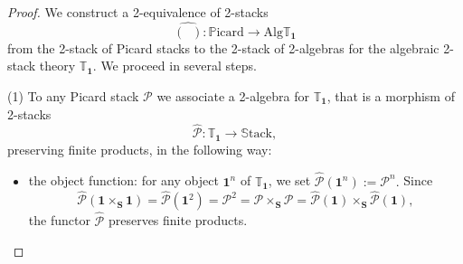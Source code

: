 \documentclass[11pt]{amsart}
\newcommand{\cP}{\mathcal{P}}
\newcommand{\PICARD}{\mathbb{P}\mathrm{icard}}
\newcommand{\STACK}{\mathbb{S}\mathrm{tack}}
\newcommand{\bS}{\textbf{S}}
\newcommand{\bfu}{\textbf{1}}
\newcommand{\twoT}{\mathbb{T}}
\newcommand{\Alg}{\mathrm{Alg}}
\theoremstyle{definition}
\numberwithin{equation}{section}
\begin{document}
\begin{proof}
	We construct a 2-equivalence of 2-stacks
	$$ \widehat{(\; \;)}:\PICARD \longrightarrow \Alg \twoT_{\bfu} $$
from the 2-stack of Picard stacks to the 2-stack of 2-algebras for the algebraic 2-stack theory $\twoT_{\bfu}.$ We proceed in several steps.

(1) To any Picard stack $\cP$ we associate a 2-algebra for $\twoT_{\bfu}$, that is a morphism of 2-stacks 
$$\widehat{\cP}: \twoT_\bfu \longrightarrow \STACK,$$
 preserving finite products, in the following way:
 \begin{itemize}
 	\item the object function: for any object $\bfu^n$ of $\twoT_\bfu$, we set $\widehat{\cP}(\bfu^n):=\cP^n. $ Since 
 	$$\widehat{\cP}(\bfu \times_\bS \bfu) =\widehat{\cP}(\bfu^2)=\cP^2 = \cP \times_\bS \cP = \widehat{\cP}(\bfu) \times_\bS \widehat{\cP}(\bfu),$$
 	 the functor  $\widehat{\cP}$ preserves finite products.
 	 

\end{itemize}
\end{proof}
\end{document}
